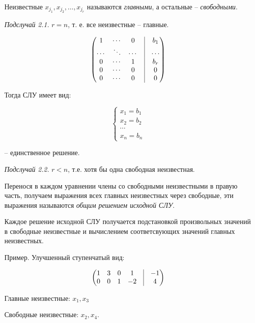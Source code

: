 Неизвестные $x_{j_1}, x_{j_2}, \dots , x_{j_r}$ называются \textit{главными}, а остальные -- \textit{свободными}.

\vspace{\baselineskip}
\textit{Подслучай 2.1.} $r = n$, т. е. все неизвестные -- главные.

\[
	\begin{pmatrix}
		1 & \cdots & 0 & \vrule & b_1 \\
        \cdots & \ddots & \cdots & \vrule & \cdots \\
        0 & \cdots & 1 & \vrule & b_r \\
       0 & \cdots & 0 & \vrule & 0 \\
       0 & \cdots & 0 & \vrule & 0
	\end{pmatrix}
\]

Тогда СЛУ имеет вид: 

\[
	\left\{
		\begin{aligned}
        x_1 = b_1 \\
        x_2 = b_2 \\
        \cdots \\
        x_n = b_n
		\end{aligned}
	\right.
\]

-- единственное решение.

\vspace{\baselineskip}
\textit{Подслучай 2.2.} $r < n$, т.е. хотя бы одна свободная неизвестная.

Перенося в каждом уравнении члены со свободными неизвестными в правую часть, получаем выражения всех главных неизвестных через свободные, эти выражения называются \textit{общим решением исходной СЛУ}.

Каждое решение исходной СЛУ получается подстановкой произвольных значений в свободные неизвестные и вычислением соответсвующих значений главных неизвестных.

\begin{comment}
	И тогда СЛУ имеет бесконечно много решений.
\end{comment}

Пример. Улучшенный ступенчатый вид: 

\[
	\begin{pmatrix}
		1 & 3 & 0 & 1 & \vrule & -1 \\
		0 & 0 & 1 & -2 & \vrule & 4
	\end{pmatrix}
\]

Главные неизвестные: $x_1, x_3$

Свободные неизвестные: $x_2, x_4$.

